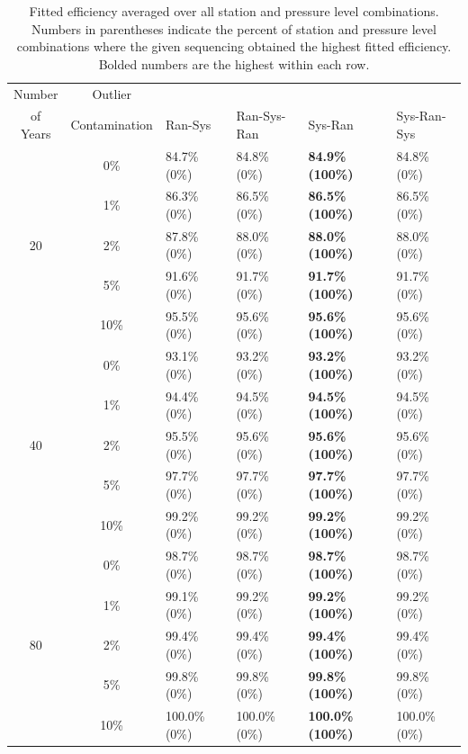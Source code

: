 \documentclass[12pt]{article}
\begin{document}
\begin{landscape}
\begin{table}[ht]
	\centering
	\begin{tabular}{cc|llll}
		\hline
		Number & Outlier & & & &\\ 
		of Years & Contamination & Ran-Sys & Ran-Sys-Ran & Sys-Ran & Sys-Ran-Sys\\ 
		\hline
		& 0\% & 84.7\% (0\%) & 84.8\% (0\%) & \textbf{84.9\% (100\%)} & 84.8\% (0\%) \\ 
		& 1\% & 86.3\% (0\%) & 86.5\% (0\%) & \textbf{86.5\% (100\%)} & 86.5\% (0\%) \\ 
		20 & 2\% & 87.8\% (0\%) & 88.0\% (0\%) & \textbf{88.0\% (100\%)} & 88.0\% (0\%) \\ 
		& 5\% & 91.6\% (0\%) & 91.7\% (0\%) & \textbf{91.7\% (100\%)} & 91.7\% (0\%) \\ 
		& 10\% & 95.5\% (0\%) & 95.6\% (0\%) & \textbf{95.6\% (100\%)} & 95.6\% (0\%) \\ 
		\hline
		& 0\% & 93.1\% (0\%) & 93.2\% (0\%) & \textbf{93.2\% (100\%)} & 93.2\% (0\%) \\ 
		& 1\% & 94.4\% (0\%) & 94.5\% (0\%) & \textbf{94.5\% (100\%)} & 94.5\% (0\%) \\ 
		40 & 2\% & 95.5\% (0\%) & 95.6\% (0\%) & \textbf{95.6\% (100\%)} & 95.6\% (0\%) \\ 
		& 5\% & 97.7\% (0\%) & 97.7\% (0\%) & \textbf{97.7\% (100\%)} & 97.7\% (0\%) \\ 
		& 10\% & 99.2\% (0\%) & 99.2\% (0\%) & \textbf{99.2\% (100\%)} & 99.2\% (0\%) \\ 
		\hline
		& 0\% & 98.7\% (0\%) & 98.7\% (0\%) & \textbf{98.7\% (100\%)} & 98.7\% (0\%) \\ 
		& 1\% & 99.1\% (0\%) & 99.2\% (0\%) & \textbf{99.2\% (100\%)} & 99.2\% (0\%) \\ 
		80 & 2\% & 99.4\% (0\%) & 99.4\% (0\%) & \textbf{99.4\% (100\%)} & 99.4\% (0\%) \\ 
		& 5\% & 99.8\% (0\%) & 99.8\% (0\%) & \textbf{99.8\% (100\%)} & 99.8\% (0\%) \\ 
		& 10\% & 100.0\% (0\%) & 100.0\% (0\%) & \textbf{100.0\% (100\%)} & 100.0\% (0\%) \\ 
  		\hline
	\end{tabular}
	\caption{Fitted efficiency averaged over all station and pressure level combinations.  Numbers in parentheses indicate the percent of station and pressure level combinations where the given sequencing obtained the highest fitted efficiency. Bolded numbers are the highest within each row.}
	\label{tab:fitEff}
\end{table}
\end{landscape}
\end{document}
